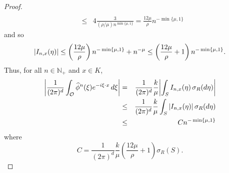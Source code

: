 \documentclass[11pt]{article}
\theoremstyle{remark}
\newcommand{\f}[2]{\frac{#1}{#2}}
\begin{document}
\begin{proof}
\begin{eqnarray*}
{    }\\
    &\leq& 4\frac{3}{(\rho/\mu) n^{\min\{\mu,1\}}}=\frac{12\mu}{\rho}n^{-\min\{\mu,1\}}
\end{eqnarray*}
and so
\begin{equation*}
    \abs{I_{n,x}(\eta)}\leq \left(\frac{12\mu}{\rho}\right)n^{-\min\{\mu,1\}}+n^{-\mu}\leq \left(\frac{12\mu}{\rho}+1\right)n^{-\min\{\mu,1\}}.
\end{equation*}
Thus, for all $n\in\mathbb{N}_+$ and $x\in K$,
\begin{eqnarray*}
\abs{\f{1}{(2\pi)^d}\int_{\mathcal{O}}\widehat{\phi}^n(\xi)e^{-i\xi\cdot x}\,d\xi}
&=&\frac{1}{(2\pi)^d}\f{k}{\mu}\abs{\int_S I_{n,x}(\eta)\,\sigma_R(d\eta)} \\
&\leq& \frac{1}{(2\pi)^d}\f{k}{\mu}\int_S \abs{I_{n,x}(\eta)}\,\sigma_R(d\eta)\\
&\leq& Cn^{-\min\{\mu,1\}}
\end{eqnarray*}
where
\begin{equation*}
    C=\f{1}{(2\pi)^d} \f{k}{\mu} \left(\frac{12\mu}{\rho}+1\right)\sigma_R(S).
\end{equation*}
\end{proof}
\end{document}
